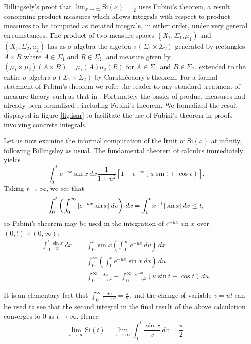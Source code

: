 \documentclass{article}
\theoremstyle{definition}
\newcommand\Si{\text{Si}}
\begin{document}
Billingsely's proof that $\lim_{x \rightarrow \infty} \Si(x) = \frac{\pi}{2}$ uses Fubini's theorem, a result concerning product measures which allows integrals with respect to product measures to be computed as iterated integrals, in either order, under very general circumstances. The product of two measure spaces $(X_1, \Sigma_1, \mu_1)$ and $(X_2, \Sigma_2, \mu_2)$ has as $\sigma$-algebra the algebra $\sigma(\Sigma_1 \times \Sigma_2)$ generated by rectangles $A \times B$ where $A \in \Sigma_1$ and $B \in \Sigma_2$, and measure given by $(\mu_1 \times \mu_2)(A \times B) = \mu_1(A)\mu_2(B)$ for $A \in \Sigma_1$ and $B \in \Sigma_2$, extended to the entire $\sigma$-algebra $\sigma(\Sigma_1 \times \Sigma_2)$ by Carath\'eodory's theorem. For a formal statement of Fubini's theorem we refer the reader to any standard treatment of measure theory, such as that in \cite{billingsley}. Fortunately the basics of product measures had already been formalized \cite{hoelzl-measure}, including Fubini's theorem. We formalized the result displayed in figure \ref{fig:isar} to facilitate the use of Fubini's theorem in proofs involving concrete integrals.

Let us now examine the informal computation of the limit of $\Si(x)$ at infinity, following Billingsley \cite{billingsley} as usual. The fundamental theorem of calculus immediately yields
\[ \int_0^t e^{-ux} \sin x \, dx \frac{1}{1+u^2}[1 - e^{-ut}(u \sin t + \cos t)]. \]
Taking $t \rightarrow \infty$, we see that
\[ \int_0^t \left( \int_0^\infty |e^{-ux} \sin x| \, du\right) \, dx = \int_0^t x^{-1} |\sin x| \, dx \le t, \]
so Fubini's theorem may be used in the integration of $e^{-ux} \sin x$ over $(0,t) \times (0, \infty)$:
\begin{align*}
\int_0^t \frac{\sin x}{x} \, dx &= \int_0^t \sin x \left(\int_0^\infty e^{-ux} \, du\right) \, dx \\
                                &= \int_0^\infty \left(\int_0^t e^{-ux} \sin x \, dx\right) \, du \\
                                &= \int_0^\infty \frac{du}{1+u^2} - \int_0^\infty \frac{e^{-ut}}{1+u^2} (u \sin t + \cos t) \, du.
\end{align*}

It is an elementary fact that $\int_0^\infty \frac{du}{1+u^2} = \frac{\pi}{2}$, and the change of variable $v = ut$ can be used to see that the second integral in the final result of the above calculation converges to $0$ as $t \rightarrow \infty$. Hence
\[ \lim_{t \rightarrow \infty} \Si(t) = \lim_{t \rightarrow \infty} \int_0^t \frac{\sin x}{x} \, dx = \frac{\pi}{2}. \]
\end{document}

